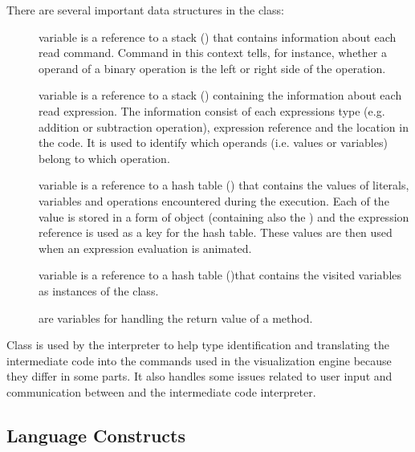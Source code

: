 There are several important data structures in the  class:
\begin{description}
\item[] variable is a reference to a stack () that contains information about each read command. Command in this context tells, for instance, whether a operand of a binary operation is the left or right side of the operation.
\item[] variable is a reference to a stack () containing the information about each read expression. The information consist of each expressions type (e.g. addition or subtraction operation), expression reference and the location in the code. It is used to
identify which operands (i.e. values or variables) belong to which operation.
\item[] variable is a reference to a hash table () that contains the values of literals, variables and operations encountered during the execution. Each of the value is stored in a form of  object (containing also the ) and the expression reference is used as a key for the hash table. These values are then used when an expression evaluation is animated.
\item[] variable is a reference to a hash table ()that contains the visited variables as instances of the  class.
\item[]
\item[]
\item[]
\item[]
\item[]
\item[]
\item[]
\item[] are variables for handling the return value of a method.
\end{description}

Class  is used by the interpreter to help type identification and
translating the intermediate code into the commands used in the visualization engine because they differ in some parts. It also handles some issues related to user input
and communication between \djava{} and the intermediate code interpreter.

\subsection{Language Constructs}
\label{sec:Language_package}

